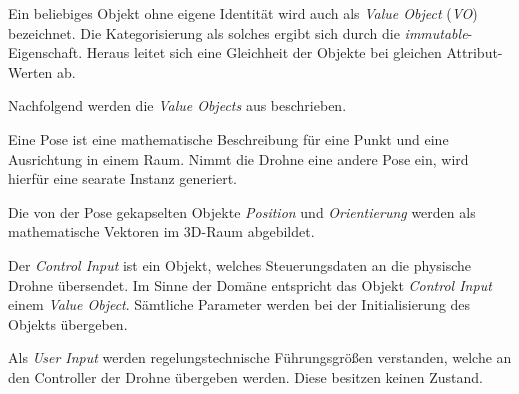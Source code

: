 
Ein beliebiges Objekt ohne eigene Identität wird auch als \textit{Value Object} (\textit{VO}) bezeichnet.
Die Kategorisierung als solches ergibt sich durch die \textit{immutable}-Eigenschaft. Heraus leitet sich eine Gleichheit der Objekte bei gleichen Attribut-Werten ab.

Nachfolgend werden die \textit{Value Objects} aus  beschrieben.


Eine Pose ist eine mathematische Beschreibung für eine Punkt und eine Ausrichtung in einem Raum. Nimmt die Drohne eine andere Pose ein, wird hierfür eine searate Instanz generiert.

Die von der Pose gekapselten Objekte \textit{Position} und \textit{Orientierung} werden als mathematische Vektoren im 3D-Raum abgebildet.


Der \textit{Control Input} ist ein Objekt, welches Steuerungsdaten an die physische Drohne übersendet.
Im Sinne der Domäne entspricht das Objekt \textit{Control Input} einem \textit{Value Object}.
Sämtliche Parameter werden bei der Initialisierung des Objekts übergeben.


Als \textit{User Input} werden regelungstechnische Führungsgrößen verstanden, welche an den Controller der Drohne übergeben werden. Diese besitzen keinen Zustand.



